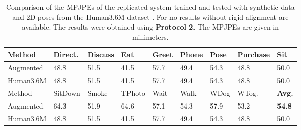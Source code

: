 \begin{table}[h]	
	\centering
	\begin{tabularx}{\textwidth}{l *{8}{Y}}
		\toprule
		Method & Direct. & Discuss & Eat & Greet & Phone & Pose & Purchase & Sit \\
		\midrule
		Augmented & 48.8 & 51.5 & 41.5 & 57.7 & 49.4 & 54.3 & 48.8 & 50.0 \\
		Human3.6M & 48.8 & 51.5 & 41.5 & 57.7 & 49.4 & 54.3 & 48.8 & 50.0 \\
		\bottomrule
		\toprule
		Method & SitDown & Smoke & TPhoto & Wait & Walk & WDog & WTog. & \textbf{Avg.}\\
		\midrule
		Augmented & 64.3 & 51.9 & 64.6 & 57.1 & 54.3 & 57.9 & 53.2 & \textbf{54.8} \\
		Human3.6M & 48.8 & 51.5 & 41.5 & 57.7 & 49.4 & 54.3 & 48.8 & 50.0 \\
		\bottomrule
	\end{tabularx}
	\caption{
		Comparison of the MPJPEs of the replicated system trained and tested with synthetic data and 2D poses from the Human3.6M dataset \cite{ionescu14}. For \cite{drover18} no results without rigid alignment are available.
		The results were obtained using \textbf{Protocol 2}. The MPJPEs are given in millimeters.
	 }
	\label{tbl:results-original-protocol2}
\end{table}